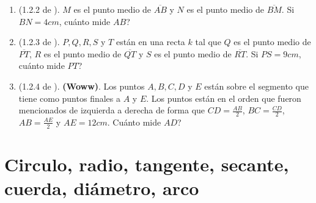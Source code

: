\begin{enumerate}
		\item (1.2.2 de \cite{Aops_Geometria}). $M$ es el punto medio de $\overline{AB}$ y $N$ es el punto medio de $\overline{BM}$. Si $BN=4cm$, cuánto mide $AB$?
		\item (1.2.3 de \cite{Aops_Geometria}). $P,Q,R,S$ y $T$ están en una recta $k$ tal que $Q$ es el punto medio de $\overline{PT}$, $R$ es el punto medio de $\overline{QT}$  y $S$ es el punto medio de $\overline{RT}$. Si $PS=9cm$, cuánto mide $PT$?
		\item (1.2.4 de \cite{Aops_Geometria}). \textbf{(Woww)}. Los puntos $A,B,C,D$ y $E$ están sobre el segmento que tiene como puntos finales a $A$ y $E$. Los puntos están en el orden que fueron mencionados de izquierda a derecha de forma que $CD=\frac{AB}{2}$, $BC=\frac{CD}{2}$, $AB=\frac{AE}{2}$ y $AE=12cm$. Cuánto mide $AD$?		
	\end{enumerate}
\newpage

\section{Circulo, radio, tangente, secante, cuerda, diámetro, arco}\label{subseccion_de_introduccion_geo_circulo}

